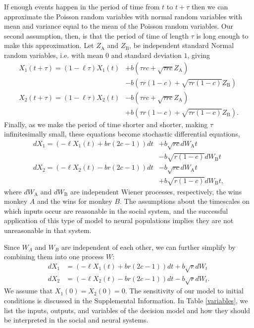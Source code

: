 \documentclass{pnastwo}
\begin{document}
\begin{article}
If enough events happen in the period of time from $t$ to $t+\tau$ then we can approximate the Poisson random variables with normal random variables with mean and variance equal to the mean of the Poisson random variables.  Our second assumption, then, is that the period of time of length $\tau$ is long enough to make this approximation. Let $Z_\text{A}$ and $Z_\text{B}$, be independent standard Normal random variables, i.e. with mean $0$ and standard deviation $1$, giving
\begin{align*}
X_1(t+\tau)=(1-\ell\tau)X_1(t)&+b\left(\tau rc+\sqrt{\tau rc}Z_{\text{A}}\right)\\&-b\left(\tau r(1-c)+\sqrt{\tau r(1-c)}Z_{\text{B}}\right)
\\X_2(t+\tau)=(1-\ell\tau)X_2(t)&-b\left(\tau rc+\sqrt{\tau rc}Z_{\text{A}}\right)\\&+b\left(\tau r(1-c)+\sqrt{\tau r(1-c)}Z_{\text{B}}\right).
\end{align*}
Finally, as we make the period of time shorter and shorter, making $\tau$ infinitesimally small, these equations become stochastic differential equations,
\begin{align*}
dX_1=\left(-\ell X_1(t)+br(2c-1)\right)dt&+b\sqrt{rc}dW_\text{A}t\\&-b\sqrt{r(1-c)}dW_\text{B}t
\\dX_2=\left(-\ell X_2(t)-br(2c-1)\right)dt&-b\sqrt{rc}dW_\text{A}t\\&+b\sqrt{r(1-c)}dW_\text{B}t,
\end{align*}
where $dW_{\text{A}}$ and $dW_{\text{B}}$ are independent Wiener processes, respectively, the wins monkey $A$ and the wins for monkey $B$. The assumptions about the timescales on which inputs occur are reasonable in the social system, and the successful application of this type of model to neural populations implies they are not unreasonable in that system. 


Since $W_A$ and $W_B$ are independent of each other, we can further simplify by combining them into one process $W$:
\begin{equation*}
\begin{array}{ll}
dX_1&=\left(-\ell X_1(t)+br(2c-1)\right)dt+b\sqrt{r}dW_{t}
\\dX_2&=\left(-\ell X_2(t)-br(2c-1)\right)dt-b\sqrt{r}dW_{t}.
\end{array}
\end{equation*}
We assume that $X_1(0)=X_2(0)=0$.  The sensitivity of our model to initial conditions is discussed in the Supplemental Information.  In Table \ref{variables}, we list the inputs, outputs, and variables of the decision model and how they should be interpreted in the social and neural systems.



\end{article}
\end{document}
